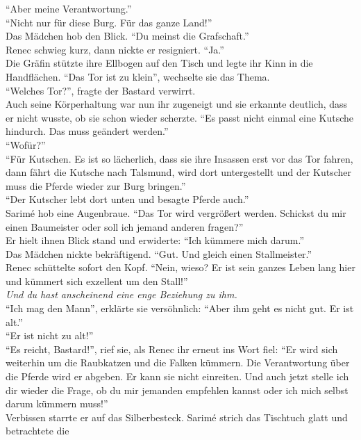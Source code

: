 ``Aber meine Verantwortung.''\\
``Nicht nur für diese Burg. Für das ganze Land!''\\
Das Mädchen hob den Blick. ``Du meinst die Grafschaft.''\\
Renec schwieg kurz, dann nickte er resigniert. ``Ja.''\\
Die Gräfin stützte ihre Ellbogen auf den Tisch und legte ihr Kinn in die Handflächen. ``Das Tor ist 
zu klein'', wechselte sie das Thema.\\
``Welches Tor?'', fragte der Bastard verwirrt.\\
Auch seine Körperhaltung war nun ihr zugeneigt und sie erkannte deutlich, dass er nicht wusste, ob 
sie schon wieder scherzte. ``Es passt nicht einmal eine Kutsche hindurch. Das muss geändert 
werden.''\\
``Wofür?''\\
``Für Kutschen. Es ist so lächerlich, dass sie ihre Insassen erst vor das Tor fahren, dann fährt 
die Kutsche nach Talsmund, wird dort untergestellt und der Kutscher muss die Pferde wieder zur Burg 
bringen.''\\
``Der Kutscher lebt dort unten und besagte Pferde auch.''\\
Sarimé hob eine Augenbraue. ``Das Tor wird vergrößert werden. Schickst du mir einen Baumeister oder 
soll ich jemand anderen fragen?''\\
Er hielt ihnen Blick stand und erwiderte: ``Ich kümmere mich darum.''\\
Das Mädchen nickte bekräftigend. ``Gut. Und gleich einen Stallmeister.''\\
Renec schüttelte sofort den Kopf. ``Nein, wieso? Er ist sein ganzes Leben lang hier und kümmert 
sich exzellent um den Stall!''\\
\textit{Und du hast anscheinend eine enge Beziehung zu ihm.}\\
``Ich mag den Mann'', erklärte sie versöhnlich: ``Aber ihm geht es nicht gut. Er ist alt.''\\
``Er ist nicht zu alt!''\\
``Es reicht, Bastard!'', rief sie, als Renec ihr erneut ins Wort fiel: ``Er wird sich weiterhin um 
die Raubkatzen und die Falken kümmern. Die Verantwortung über die Pferde wird er abgeben. Er kann 
sie nicht einreiten. Und auch jetzt stelle ich dir wieder die Frage, ob du mir jemanden empfehlen 
kannst oder ich mich selbst darum kümmern muss!''\\
Verbissen starrte er auf das Silberbesteck. Sarimé strich das Tischtuch glatt und betrachtete die 
